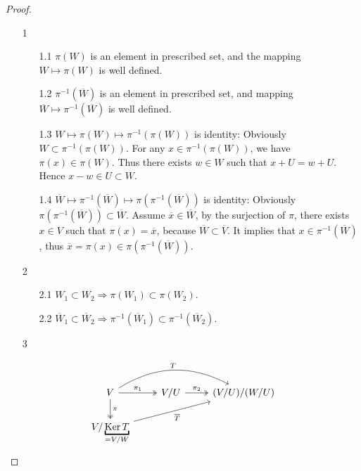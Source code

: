 \begin{proof}
    \hfill

    \begin{enumerate}
        \item[1]
        \begin{enumerate}
            \item[1.1] $\pi(W)$ is an element in prescribed set, and the mapping $W \mapsto \pi(W)$ is well defined.
            \item[1.2] $\pi^{-1}(\overline{W})$ is an element in prescribed set, and mapping $\overline{W} \mapsto \pi^{-1}(\overline{W})$ is well defined.
            \item[1.3] $W \mapsto \pi(W) \mapsto \pi^{-1}(\pi(W))$ is identity: Obviously $W \subset \pi^{-1}(\pi(W))$. For any $x \in \pi^{-1}(\pi (W))$, we have $\pi(x) \in \pi(W)$. Thus there exists $w \in W$ such that $x + U = w + U$. Hence $x - w \in U \subset W$.
            \item[1.4] $\overline{W} \mapsto \pi^{-1}(\overline{W}) \mapsto \pi(\pi^{-1} (\overline{W}))$ is identity: Obviously $\pi(\pi^{-1}(\overline{W})) \subset \overline{W}$.  Assume $\overline{x} \in \overline{W}$, by the surjection of $\pi$, there exists $x \in V$ such that $\pi(x) = \overline{x}$, because $\overline{W} \subset \overline{V}$. It implies that $x \in \pi^{-1}(\overline{W})$, thus $\overline{x} = \pi(x) \in \pi(\pi^{-1}(\overline{W}))$.
        \end{enumerate}
    \item[2]
    \begin{enumerate}
        \item[2.1] $W_1 \subset W_2 \Rightarrow \pi(W_1) \subset \pi(W_2)$.
        \item[2.2] $\overline{W}_1 \subset \overline{W}_2 \Rightarrow \pi^{-1}(\overline{W}_1) \subset \pi^{-1}(\overline{W}_2)$.  
    \end{enumerate}
    \item[3]
    \end{enumerate}
    \[
    \begin{tikzcd}
        V \arrow[two heads, r, "\pi_1"] \arrow[two heads, d, "\pi"] \arrow[rr, bend left, "T"]
        & V/U \arrow[two heads, r, "\pi_2"]
        & (V/U) / (W/U)
        \\
        V / \underbracket{\Ker T}_{=V/W}  \arrow[rru, "\overline{T}"']
    \end{tikzcd}
    \]
\end{proof}











